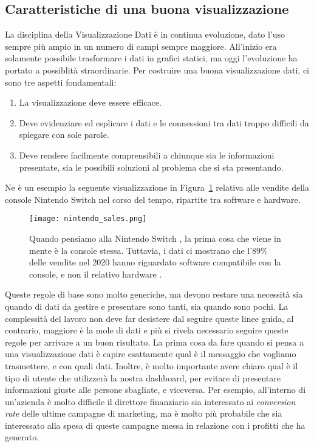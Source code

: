 \subsection{Caratteristiche di una buona visualizzazione}
La disciplina della Visualizzazione Dati è in continua evoluzione, dato l'uso sempre più ampio in un numero di campi sempre maggiore. All'inizio era solamente possibile trasformare i dati in grafici statici, ma oggi l'evoluzione ha portato a possiblità straordinarie.
Per costruire una buona visualizzazione dati, ci sono tre aspetti fondamentali:
\begin{enumerate}
    \item La visualizzazione deve essere efficace.
    \item Deve evidenziare ed esplicare i dati e le connessioni tra dati troppo difficili da spiegare con sole parole.
    \item Deve rendere facilmente comprensibili a chiunque sia le informazioni presentate, sia le possibili soluzioni al problema che si sta presentando.
\end{enumerate}
Ne è un esempio la seguente visualizzazione in Figura~\ref{fig:nintendo_sales} relativa alle vendite della console Nintendo Switch \texttrademark nel corso del tempo, ripartite tra software e hardware.
\begin{figure}
    \centering
    \texttt{[image: nintendo\_sales.png]}
    \caption[Dataviz: vendite di console Nintendo Switch]{Quando pensiamo alla Nintendo Switch \texttrademark, la prima cosa che viene in mente è la console stessa. Tuttavia, i dati ci mostrano che l'89\% delle vendite nel 2020 hanno riguardato software compatibile con la console, e non il relativo hardware \cite{DataVisualization_Caratteristiche}.}
    \label{fig:nintendo_sales}
\end{figure}
Queste regole di base sono molto generiche, ma devono restare una necessità sia quando di dati da gestire e presentare sono tanti, sia quando sono pochi. La complessità del lavoro non deve far desistere dal seguire queste linee guida, al contrario, maggiore è la mole di dati e più si rivela necessario seguire queste regole per arrivare a un buon risultato.
La prima cosa da fare quando si pensa a una visualizzazione dati è capire esattamente qual è il messaggio che vogliamo trasmettere, e con quali dati. Inoltre, è molto importante avere chiaro qual è il tipo di utente che utilizzerà la nostra dashboard, per evitare di presentare informazioni giuste alle persone sbagliate, e viceversa. Per esempio, all'interno di un'azienda è molto difficile il direttore finanziario sia interessato ai \textit{conversion rate} delle ultime campagne di marketing, ma è molto più probabile che sia interessato alla spesa di queste campagne messa in relazione con i profitti che ha generato.
